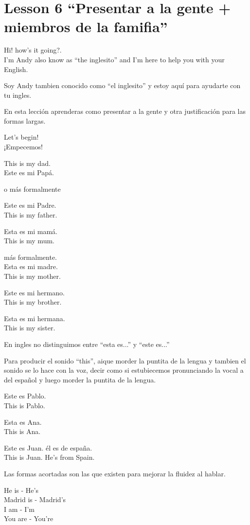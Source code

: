 \section{Lesson 6 ``Presentar a la gente + miembros de la famifia''}

Hi! how's it going?.\\
I'm Andy also know as ``the inglesito'' and I'm here to help you with your
English.

Soy Andy tambien conocido como ``el inglesito'' y estoy aquí para ayudarte con
tu ingles.

En esta lección aprenderas como presentar a la gente y otra justificación
para las formas largas.

Let's begin!\\
¡Empecemos!

This is my dad.\\
Este es mi Papá.

o más formalmente

Este es mi Padre.\\
This is my father.

Esta es mi mamá.\\
This is my mum.

más formalmente.\\
Esta es mi madre.\\
This is my mother.

Este es mi hermano.\\
This is my brother.

Esta es mi hermana.\\
This is my sister.

En ingles no distinguimos entre ``esta es...'' y ``este es...''

Para producir el sonido ``this'', aique morder la puntita de la lengua y
tambien el sonido se lo hace con la voz, decir como si estubiecemos
pronunciando la vocal a del español y luego morder la puntita de la lengua.

Este es Pablo.\\
This is Pablo.

Esta es Ana.\\
This is Ana.

Este es Juan. él es de españa.\\
This is Juan. He's from Spain.

Las formas acortadas son las que existen para mejorar la fluidez al hablar.

He is - He's\\
Madrid is - Madrid's\\
I am - I'm\\
You are - You're\\

